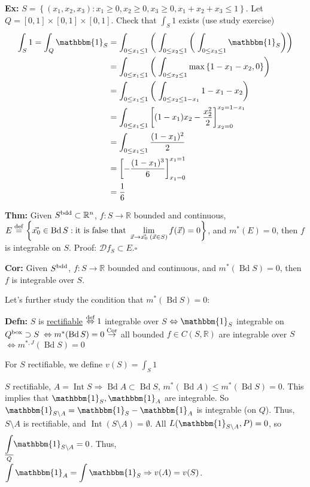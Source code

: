 \documentclass[10pt,letterpaper]{article}
\newcommand{\n}{\hfill\break}
\newcommand{\defn}[1]{\par\noindent\settowidth{\hangindent}{\textbf{Defn: }}\textbf{Defn: }#1\n}
\newcommand{\thm}[1]{\par\noindent\settowidth{\hangindent}{\textbf{Thm: }}\textbf{Thm: }#1\n}
\newcommand{\cor}[1]{\par\noindent\settowidth{\hangindent}{\textbf{Cor: }}\textbf{Cor: }#1\n}
\newcommand{\ex}[1]{\par\noindent\settowidth{\hangindent}{\textbf{Ex: }}\textbf{Ex: }#1\n}
\newcommand{\proven}{\;$\square$\n}
\newcommand{\ptxt}[1]{\textrm{\textnormal{#1}}}
\newcommand{\set}[1]{\left\{#1\right\}}
\newcommand{\reals}{\mathbb{R}}
\newcommand{\R}{\reals}
\newcommand{\Ind}{\mathbbm{1}}
\newcommand{\cut}{\setminus}
\DeclareMathOperator{\Int}{Int}
\DeclareMathOperator{\Bd}{Bd}
\newcommand{\lint}[2]{\underset{#1}{\overset{#2}{{\color{black}\underline{{\color{white}\overline{{\color{black}\int}}\color{black}}}}}}}
\newcommand{\paren}[1]{\left(#1\right)}
\renewcommand{\brack}[1]{\left[#1\right]}
\begin{document}
\newpage
\ex{$S=\set{(x_{1},x_{2},x_{3}):x_{1}\ge{}0,x_{2}\ge{}0,x_{3}\ge{}0,x_{1}+x_{2}+x_{3}\le{}1}$. Let $Q=[0,1]\times[0,1]\times[0,1]$.\n
\n
Check that $\int_{S}1$ exists (use study exercise)
\begin{align*}
\int_{S}1=\int_{Q}\Ind_{S} & =\int_{0\le{}x_{1}\le{}1}\paren{\;\int_{0\le{}x_{2}\le{}1}\paren{\;\int_{0\le{}x_{3}\le{}1}\Ind_{S}}}\\
                           & =\int_{0\le{}x_{1}\le{}1}\paren{\;\int_{0\le{}x_{2}\le{}1}\max\set{1-x_{1}-x_{2},0}}\\
                           & =\int_{0\le{}x_{1}\le{}1}\paren{\;\int_{0\le{}x_{2}\le{}1-x_{1}}1-x_{1}-x_{2}}\\
                           & =\int_{0\le{}x_{1}\le{}1}\brack{(1-x_{1})x_{2}-\frac{x_{2}^{2}}{2}}_{x_{2}=0}^{x_{2}=1-x_{1}}\\
                           & =\int_{0\le{}x_{1}\le{}1}\frac{(1-x_{1})^{2}}{2}\\
                           & =\brack{-\frac{(1-x_{1})^{3}}{6}}_{x_{1}=0}^{x_{1}=1}\\
                           & =\frac{1}{6}
\end{align*}}

\thm{Given $S^{\ptxt{bdd}}\subset\R^{n}$, $f:S\to\R$ bounded and continuous, $\displaystyle{}E\overset{\ptxt{def}}{=}\set{\vec{x_{0}}\in\Bd{}S:\ptxt{it is false that }\lim_{\vec{x}\to\vec{x_{0}}\;(\vec{x}\in{}S)}f(\vec{x})=0}$, and $m^{*}(E)=0$, then $f$ is integrable on $S$.\n
Proof: $\mathscr{D}f_{S}\subset{}E$.\proven}

\cor{Given $S^{\ptxt{bdd}}$, $f:S\to\R$ bounded and continuous, and $m^{*}(\Bd{}S)=0$, then $f$ is integrable over $S$.}

\par\noindent Let's further study the condition that $m^{*}(\Bd{}S)=0$:

\defn{$S$ is \underline{rectifiable}\n
$\overset{\ptxt{def}}{\Leftrightarrow}1$ integrable over $S$\n
$\Leftrightarrow\Ind_{S}$ integrable on $Q^{\ptxt{box}}\supset{}S$\n
$\Leftrightarrow{}m^{*}(\Bd{}S)=0\overset{\ptxt{Cor}}{\to}$ all bounded $f\in{}C(S,\R)$ are integrable over $S$\n
$\Leftrightarrow{}m^{*,J}(\Bd{}S)=0$}

\par\noindent For $S$ rectifiable, we define $v(S)=\int_{S}1$\n

\par\noindent $S$ rectifiable, $A=\Int{}S\Rightarrow\Bd{}A\subset\Bd{}S$, $m^{*}(\Bd{}A)\le{}m^{*}(\Bd{}S)=0$. This implies that $\Ind_{S},\Ind_{A}$ are integrable. So $\Ind_{S\cut{}A}=\Ind_{S}-\Ind_{A}$ is integrable (on $Q$). Thus, $S\cut{}A$ is rectifiable, and $\Int(S\cut{}A)=\emptyset$.\n
All $L(\Ind_{S\cut{}A},P)=0$, so $\displaystyle\lint{Q}{}\Ind_{S\cut{}A}=0$. Thus, $\displaystyle\int\Ind_{A}=\int\Ind_{S}\Rightarrow{}v(A)=v(S)$.\n
\end{document}
